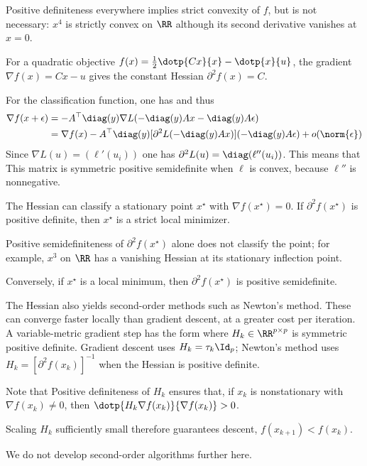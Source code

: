 Positive definiteness everywhere implies strict convexity of $f$, but is not necessary: $x^4$ is strictly convex on $\RR$ although its second derivative vanishes at $x=0$.

For a quadratic objective $f(x)=\frac12\dotp{Cx}{x}-\dotp{x}{u}$, the gradient $\nabla f(x) = Cx-u$ gives the constant Hessian $\partial^2 f(x) = C$.
 
For the classification function, one has 
and thus
\begin{align*}
	\nabla f(x+\epsilon) &= -A^\top \diag(y) \nabla L( -\diag(y) Ax-\diag(y)A\epsilon)  \\
		&= \nabla f(x)  -A^\top \diag(y) [\partial^2 L( -\diag(y) Ax)]( -\diag(y) A\epsilon) + o(\norm{\epsilon})
\end{align*}
Since $\nabla L(u) = (\ell'(u_i))$ one has $\partial^2 L(u)=\diag(\ell''(u_i))$. This means that 
This matrix is symmetric positive semidefinite when $\ell$ is convex, because $\ell''$ is nonnegative.

\begin{rem}
The Hessian can classify a stationary point $x^\star$ with $\nabla f(x^\star)=0$. If $\partial^2 f(x^\star)$ is positive definite, then $x^\star$ is a strict local minimizer.
 
Positive semidefiniteness of $\partial^2 f(x^\star)$ alone does not classify the point; for example, $x^3$ on $\RR$ has a vanishing Hessian at its stationary inflection point.
 
Conversely, if $x^\star$ is a local minimum, then $\partial^2 f(x^\star)$ is positive semidefinite.
\end{rem}

\begin{rem}
The Hessian also yields second-order methods such as Newton's method. These can converge faster locally than gradient descent, at a greater cost per iteration. A variable-metric gradient step has the form
where $H_k \in \RR^{p \times p}$ is symmetric positive definite. Gradient descent uses $H_k=\tau_k \Id_p$; Newton's method uses $H_k=[\partial^2 f(x_k)]^{-1}$ when the Hessian is positive definite.
 
Note that
Positive definiteness of $H_k$ ensures that, if $x_k$ is nonstationary with $\nabla f(x_k)\neq0$, then $\dotp{H_k \nabla f(x_k)}{\nabla f(x_k)}>0$.
 
Scaling $H_k$ sufficiently small therefore guarantees descent, $f(x_{k+1}) < f(x_k)$.
 
We do not develop second-order algorithms further here.
\end{rem}

